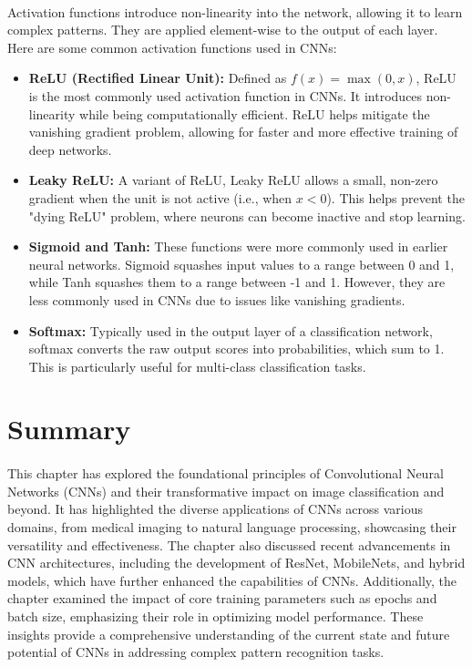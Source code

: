 \paragraph{}
Activation functions introduce non-linearity into the network, allowing it to learn complex patterns. They are applied element-wise to the output of each layer. Here are some common activation functions used in CNNs:

\begin{itemize}
    \item \textbf{ReLU (Rectified Linear Unit):} Defined as \( f(x) = \max(0, x) \), ReLU is the most commonly used activation function in CNNs. It introduces non-linearity while being computationally efficient. ReLU helps mitigate the vanishing gradient problem, allowing for faster and more effective training of deep networks.
    
    \item \textbf{Leaky ReLU:} A variant of ReLU, Leaky ReLU allows a small, non-zero gradient when the unit is not active (i.e., when \( x < 0 \)). This helps prevent the "dying ReLU" problem, where neurons can become inactive and stop learning.
    
    \item \textbf{Sigmoid and Tanh:} These functions were more commonly used in earlier neural networks. Sigmoid squashes input values to a range between 0 and 1, while Tanh squashes them to a range between -1 and 1. However, they are less commonly used in CNNs due to issues like vanishing gradients.
    
    \item \textbf{Softmax:} Typically used in the output layer of a classification network, softmax converts the raw output scores into probabilities, which sum to 1. This is particularly useful for multi-class classification tasks.
\end{itemize}

\section{Summary}
\label{sec:summary}

\vspace{0.5cm}

\paragraph{}
This chapter has explored the foundational principles of Convolutional Neural Networks (CNNs) and their transformative impact on image classification and beyond. It has highlighted the diverse applications of CNNs across various domains, from medical imaging to natural language processing, showcasing their versatility and effectiveness. The chapter also discussed recent advancements in CNN architectures, including the development of ResNet, MobileNets, and hybrid models, which have further enhanced the capabilities of CNNs. Additionally, the chapter examined the impact of core training parameters such as epochs and batch size, emphasizing their role in optimizing model performance. These insights provide a comprehensive understanding of the current state and future potential of CNNs in addressing complex pattern recognition tasks.